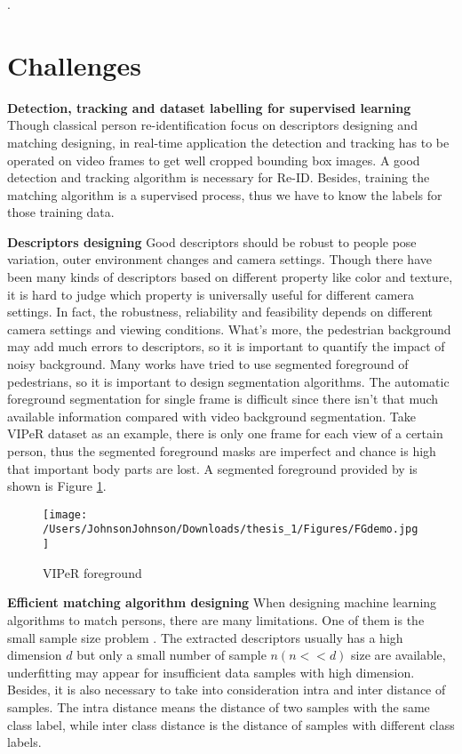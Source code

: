 .

\section{Challenges}

\textbf{Detection, tracking and dataset labelling for supervised learning} Though classical person re-identification focus on descriptors designing and matching designing, in real-time application the detection and tracking has to be operated on video frames to get well cropped bounding box images. A good detection and tracking algorithm is necessary for Re-ID. Besides, training the matching algorithm is a supervised process, thus we have to know the labels for those training data. 

\textbf{Descriptors designing} Good descriptors should be robust to people pose variation, outer environment changes and camera settings. Though there have been many kinds of descriptors based on different property like color and texture, it is hard to judge which property is universally useful for different camera settings. In fact, the robustness, reliability and feasibility depends on different camera settings and viewing conditions. What's more, the pedestrian background may add much errors to descriptors, so it is important to quantify the impact of noisy background. Many works have tried to use segmented foreground of pedestrians, so it is important to design segmentation algorithms. The automatic foreground segmentation for single frame is difficult since there isn't that much available information compared with video background segmentation. Take VIPeR dataset as an example, there is only one frame for each view of a certain person, thus the segmented foreground masks are imperfect and chance is high that important body parts are lost. A segmented foreground provided by \cite{SDALF} is shown is Figure \ref{VIPeRFG}.
\begin{figure}[H]
\centering
\texttt{[image: /Users/JohnsonJohnson/Downloads/thesis\_1/Figures/FGdemo.jpg]}
\vspace{-3em}
\caption{VIPeR foreground}
\label{VIPeRFG}
\end{figure}

\textbf{Efficient matching algorithm designing} 	
When designing machine learning algorithms to match persons, there are many limitations. One of them is the small sample size problem \cite{NFST}. The extracted descriptors usually has a high dimension $d$ but only a small number of sample $n(n<<d)$ size are available, underfitting may appear for insufficient data samples with high dimension. Besides, it is also necessary to take into consideration intra and inter distance of samples.
The intra distance means the distance of two samples with the same class label, while inter class distance is the distance of samples with different class labels. 

